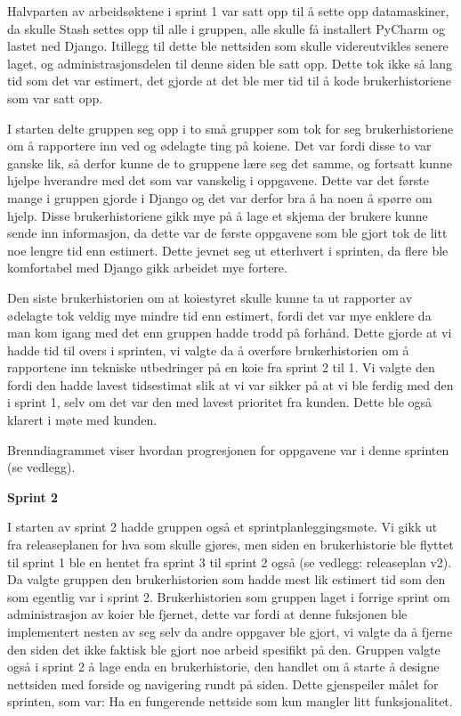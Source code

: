 \documentclass[12pt,a4paper,norsk]{article}
\begin{document}
Halvparten av arbeidsøktene i sprint 1 var satt opp til å sette opp datamaskiner, da skulle Stash settes opp til alle i gruppen, alle skulle få installert PyCharm og lastet ned Django. Itillegg til dette ble nettsiden som skulle videreutvikles senere laget, og administrasjonsdelen til denne siden ble satt opp. Dette tok ikke så lang tid som det var estimert, det gjorde at det ble mer tid til å kode brukerhistoriene som var satt opp. 

I starten delte gruppen seg opp i to små grupper som tok for seg brukerhistoriene om å rapportere inn ved og ødelagte ting på koiene. Det var fordi disse to var ganske lik, så derfor kunne de to gruppene lære seg det samme, og fortsatt kunne hjelpe hverandre med det som var vanskelig i oppgavene. Dette var det første mange i gruppen gjorde i Django og det var derfor bra å ha noen å spørre om hjelp. Disse brukerhistoriene gikk mye på å lage et skjema der brukere kunne sende inn informasjon, da dette var de første oppgavene som ble gjort tok de litt noe lengre tid enn estimert. Dette jevnet seg ut etterhvert i sprinten, da flere ble komfortabel med Django gikk arbeidet mye fortere. 

Den siste brukerhistorien om at koiestyret skulle kunne ta ut rapporter av ødelagte tok veldig mye mindre tid enn estimert, fordi det var mye enklere da man kom igang med det enn gruppen hadde trodd på forhånd. Dette gjorde at vi hadde tid til overs i sprinten, vi valgte da å overføre brukerhistorien om å rapportene inn tekniske utbedringer på en koie fra sprint 2 til 1.  Vi valgte den fordi den hadde lavest tidsestimat slik at vi var sikker på at vi ble ferdig med den i sprint 1, selv om det var den med lavest prioritet fra kunden. Dette ble også klarert i møte med kunden. 

Brenndiagrammet viser hvordan progresjonen for oppgavene var i denne sprinten (se vedlegg).

\bigskip \noindent \textbf{Sprint 2}
\par I starten av sprint 2 hadde gruppen også et sprintplanleggingsmøte. Vi gikk ut fra releaseplanen for hva som skulle gjøres, men siden en brukerhistorie ble flyttet til sprint 1 ble en hentet fra sprint 3 til sprint 2 også (se vedlegg: releaseplan v2). Da valgte gruppen den brukerhistorien som hadde mest lik estimert tid som den som egentlig var i sprint 2. Brukerhistorien som gruppen laget i forrige sprint om administrasjon av koier ble fjernet, dette var fordi at denne fuksjonen ble implementert nesten av seg selv da andre oppgaver ble gjort, vi valgte da å fjerne den siden det ikke faktisk ble gjort noe arbeid spesifikt på den. Gruppen valgte også i sprint 2 å lage enda en brukerhistorie, den handlet om å starte å designe nettsiden med forside og navigering rundt på siden. Dette gjenspeiler målet for sprinten, som var: Ha en fungerende nettside som kun mangler litt funksjonalitet.
\end{document}
